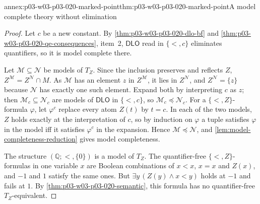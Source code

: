 \begin{annexitem}{annex:p03-w03-p03-020-marked-point}{thm:p03-w03-p03-020-marked-point}{A model complete theory without elimination}
\begin{proof}
Let \(c\) be a new constant. By
\cref{thm:p03-w03-p03-020-dlo-bf} and
\cref{thm:p03-w03-p03-020-qe-consequences}, item~2, \(\mathsf{DLO}\) read
in \(\{<,c\}\) eliminates quantifiers, so it is model complete there.

Let \(\mathcal M\subseteq\mathcal N\) be models of \(T_Z\). Since the
inclusion preserves and reflects \(Z\), \(Z^{\mathcal M}=Z^{\mathcal N}\cap M\).
As \(\mathcal M\) has an element \(z\) in \(Z^{\mathcal M}\), it lies in
\(Z^{\mathcal N}\), and \(Z^{\mathcal N}=\{z\}\) because \(\mathcal N\) has
exactly one such element. Expand both by interpreting \(c\) as \(z\); then
\(\mathcal M_c\subseteq\mathcal N_c\) are models of \(\mathsf{DLO}\) in
\(\{<,c\}\), so \(\mathcal M_c\preccurlyeq\mathcal N_c\). For a
\(\{<,Z\}\)-formula \(\varphi\), let \(\varphi^c\) replace every atom
\(Z(t)\) by \(t=c\). In each of the two models, \(Z\) holds exactly at the
interpretation of \(c\), so by induction on \(\varphi\) a tuple satisfies
\(\varphi\) in the model iff it satisfies \(\varphi^c\) in the expansion.
Hence \(\mathcal M\preccurlyeq\mathcal N\), and
\cref{lem:model-completeness-reduction} gives model completeness.

The structure \((\mathbb Q;<,\{0\})\) is a model of \(T_Z\). The
quantifier-free \(\{<,Z\}\)-formulas in one variable \(x\) are Boolean
combinations of \(x<x\), \(x=x\) and \(Z(x)\), and \(-1\) and \(1\) satisfy
the same ones. But \(\exists y\,(Z(y)\land x<y)\) holds at \(-1\) and fails
at \(1\). By \cref{thm:p03-w03-p03-020-semantic}, this formula has no
quantifier-free \(T_Z\)-equivalent.
\end{proof}
\end{annexitem}


